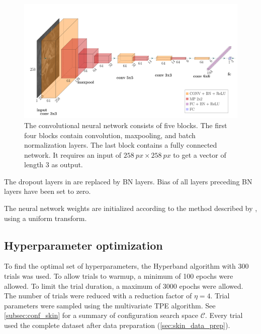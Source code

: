 \begin{figure}
    \includegraphics{skinstression/images/skinstression.pdf}
    \caption[Network architecture]{
        The convolutional neural network consists of five blocks.
        The first four blocks contain convolution, maxpooling, and batch normalization layers.
        The last block contains a fully connected network.
        It requires an input of $\qty{258}{px}\times\qty{258}{px}$ to get a vector of length 3 as output.
    }
    \label{fig:model}
\end{figure}

The dropout layers in \cite{Soylu2022} are replaced by BN layers.
Bias of all layers preceding BN layers have been set to zero.

The neural network weights are initialized according to the method described by \textcite{He2015a}, using a uniform transform.

\subsection{Hyperparameter optimization}
To find the optimal set of hyperparameters, the Hyperband algorithm with 300 trials was used.
To allow trials to warmup, a minimum of 100 epochs were allowed.
To limit the trial duration, a maximum of 3000 epochs were allowed.
The number of trials were reduced with a reduction factor of $\eta=4$.
Trial parameters were sampled using the multivariate TPE algorithm.
See \cref{subsec:conf_skin} for a summary of configuration search space $\mathcal{C}$.
Every trial used the complete dataset after data preparation (\cref{sec:skin_data_prep}).

